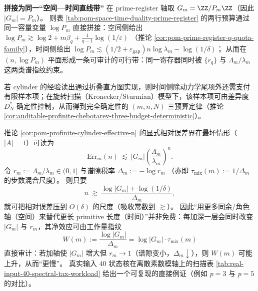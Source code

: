 \noindent\textbf{拼接为同一“空间—时间直线带”}
在 prime-register 轴取 \(G_m=\ZZ/P_m\ZZ\)（因此 \(|G_m|=P_m\)）。
则表 \ref{tab:pom-space-time-duality-prime-register} 的两行预算通过同一容量变量 \(\log P_m\) 直接拼接：空间侧给出
\(
\log P_m\gtrsim \log 2+m\beta_q+\frac{1}{q-1}\log(1/\varepsilon)
\)
（推论 \ref{cor:pom-prime-register-q-quota-family}），时间侧给出
\(
\log P_m\lesssim (1/2+\varepsilon_{\mathrm{gap}})n\log\lambda_m-\log(1/\delta)
\)；
从而在 \((n,\log P_m)\) 平面形成一条可审计的可行带：同一寄存器同时被 \(\{r_q\}\) 与 \(\Lambda_m/\lambda_m\) 这两类谱指纹约束。
\par
若 cylinder 的经验读出通过折叠直方图实现，则时间侧除动力学尾项外还需支付有限样本项；在旋转扫描（Kronecker/Sturmian）模型下，该样本项可由差异度 \(D_N^*\) 确定性控制，从而得到完全确定性的 \((m,n,N)\) 三预算定律（推论 \ref{cor:auditable-profinite-chebotarev-three-budget-deterministic}）。

\begin{remark}\label{rem:pom-spectral-tax-workload}
推论 \ref{cor:pom-profinite-cylinder-effective-n} 的显式相对误差界在最坏情形（\(|A|=1\)）可读为
\[
\mathrm{Err}_m(n)\ \lesssim\ |G_m|\left(\frac{\Lambda_m}{\lambda_m}\right)^n.
\]
令
\(
r_m:=\Lambda_m/\lambda_m\in(0,1]
\)
与谱隙税率
\(
\Delta_m:=-\log r_m
\)
（亦即 \(\tau_{\mathrm{mix}}(m):=1/\Delta_m\) 的步数混合尺度）。
则只要
\[
n\ \gtrsim\ \frac{\log|G_m|+\log(1/\delta)}{\Delta_m},
\]
就可把相对误差压到 \(O(\delta)\) 的尺度（吸收常数到 \(\gtrsim\)）。
因此“用更多同余/角色轴（空间）来替代更长 primitive 长度（时间）”并非免费：每加深一层会同时改变
\(|G_m|\) 与 \(r_m\)，其净效应可由工作量指纹
\[
W(m):=\frac{\log|G_m|}{\Delta_m}=\log|G_m|\cdot\tau_{\mathrm{mix}}(m)
\]
直接审计：若加轴使 \(|G_m|\) 增大但 \(r_m\to 1\)（谱隙变小，\(\Delta_m\downarrow\)），则 \(W(m)\) 可能上升，从而“更慢”。
真实输入 \(40\) 状态核在离散素数模轴上的扫描表 \ref{tab:real-input-40-spectral-tax-workload} 给出一个可复现的直接例证（例如 \(p=3\) 与 \(p=5\) 的对比）。
\end{remark}




